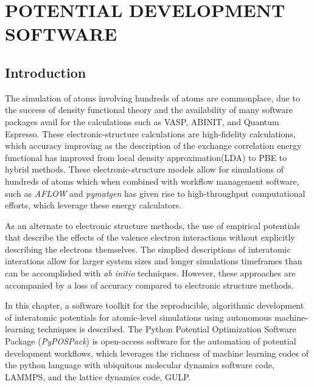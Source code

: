 \chapter{POTENTIAL DEVELOPMENT SOFTWARE}
\label{ch:software}
\lstset{
	language=python,
	numbers=left,
	numberstyle=\tiny,
	columns=fullflexible,
	showstringspaces=false
}
\section{Introduction}

The simulation of atoms involving hundreds of atoms are commonplace, due to the success of density functional theory\cite{hohenberg1964_dft,kohn1965_dft} and the availability of many software packages avail for the calculations such as VASP\cite{kresse1993_vasp,kresse1996_vasp1,kresse1996_vasp2}, ABINIT\cite{gonze2002_abinit,gonze2005_abinit,gonze2009_abinit,gonze2016_abinit}, and Quantum Espresso\cite{giannozzi2009_quantumespresso}.
These electronic-structure calculations are high-fidelity calculations, which accuracy improving as the description of the exchange correlation energy functional has improved from local density approximation(LDA) to PBE to hybrid methods.
These electronic-structure models allow for simulations of hundreds of atoms which when combined with workflow management software, such as \emph{AFLOW}\cite{curtarolo2012_aflow} and \emph{pymatgen}\cite{ong2013_pymatgen} has given rise to high-throughput computational efforts, which leverage these energy calculators.

As an alternate to electronic structure methods, the use of empirical potentials that describe the effects of the valence electron interactions without explicitly describing the electrons themselves.  The simplied descriptions of interatomic interations allow for larger system sizes and longer simulations timeframes than can be accomplished with \emph{ab initio} techniques.  However, these approaches are accompanied by a loss of accuracy compared to electronic structure methods.

In this chapter, a software toolkit for the reproducible, algorithmic development of interatomic potentials for atomic-level simulations using autonomous machine-learning techniques is described.
The Python Potential Optimization Software Package (\emph{PyPOSPack}) is open-access software for the automation of potential development workflows, which leverages the richness of machine learning codes of the python language with ubiquitous molecular dynamics software code, LAMMPS\cite{plimpton1995_lammps}, and the lattice dynamics code, GULP\cite{gale2003_gulp}.


